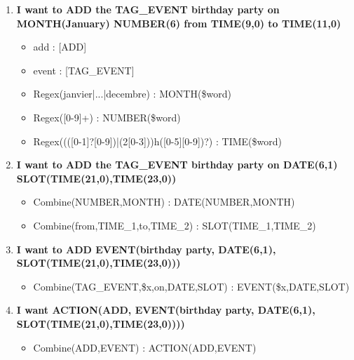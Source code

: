                 \begin{enumerate}
            	\item \textbf{I want to ADD the TAG\_EVENT birthday party on MONTH(January) NUMBER(6) from TIME(9,0) to TIME(11,0)}
                	\begin{itemize}
                    	\item add : [ADD]
                        \item event : [TAG\_EVENT]
                        \item Regex(janvier|...|decembre) : MONTH(\$word)
                        \item Regex([0-9]+) : NUMBER(\$word)
                        \item Regex((([0-1]?[0-9])|(2[0-3]))h([0-5][0-9])?) : TIME(\$word)
                    \end{itemize}
              	\item \textbf{I want to ADD the TAG\_EVENT birthday party on DATE(6,1) \\ SLOT(TIME(21,0),TIME(23,0))}
                	\begin{itemize}
                    	\item Combine(NUMBER,MONTH) : DATE(NUMBER,MONTH)
                        \item Combine(from,TIME\_1,to,TIME\_2) : SLOT(TIME\_1,TIME\_2)
                    \end{itemize}
              	\item \textbf{I want to ADD EVENT(birthday party, DATE(6,1), \\ SLOT(TIME(21,0),TIME(23,0)))}
                	\begin{itemize}
                    	\item Combine(TAG\_EVENT,\$x,on,DATE,SLOT) : EVENT(\$x,DATE,SLOT)
                    \end{itemize}
               	\item \textbf{I want ACTION(ADD, EVENT(birthday party, DATE(6,1), \\ SLOT(TIME(21,0),TIME(23,0))))}
                	\begin{itemize}
                    	\item Combine(ADD,EVENT) : ACTION(ADD,EVENT)
                    \end{itemize}
            \end{enumerate}
                
